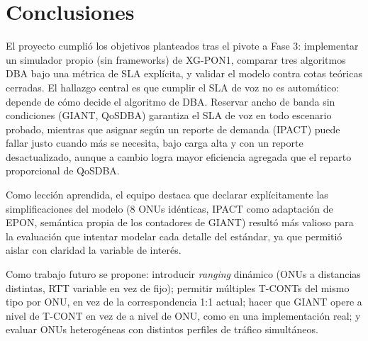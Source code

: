 \documentclass[conference]{IEEEtran}
\begin{document}
\section{Conclusiones}
\label{sec:conclusiones}

El proyecto cumplió los objetivos planteados tras el pivote a Fase 3:
implementar un simulador propio (sin frameworks) de XG-PON1, comparar
tres algoritmos DBA bajo una métrica de SLA explícita, y validar el
modelo contra cotas teóricas cerradas. El hallazgo central es que
cumplir el SLA de voz no es automático: depende de cómo decide
el algoritmo de DBA. Reservar ancho de banda sin condiciones (GIANT,
QoSDBA) garantiza el SLA de voz en todo escenario probado, mientras que
asignar según un reporte de demanda (IPACT) puede fallar justo cuando más
se necesita, bajo carga alta y con un reporte desactualizado, aunque a
cambio logra mayor eficiencia agregada que el reparto proporcional de
QoSDBA.

Como lección aprendida, el equipo destaca que declarar explícitamente las
simplificaciones del modelo (8 ONUs idénticas, IPACT como adaptación de
EPON, semántica propia de los contadores de GIANT) resultó más valioso
para la evaluación que intentar modelar cada detalle del estándar, ya que
permitió aislar con claridad la variable de interés.

Como trabajo futuro se propone: introducir \emph{ranging} dinámico
(ONUs a distancias distintas, RTT variable en vez de fijo); permitir
múltiples T-CONTs del mismo tipo por ONU, en vez de la correspondencia
1:1 actual; hacer que GIANT opere a nivel de T-CONT en vez de a nivel de
ONU, como en una implementación real; y evaluar ONUs heterogéneas con
distintos perfiles de tráfico simultáneos.
\end{document}
